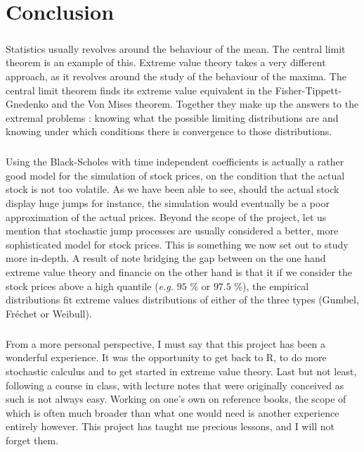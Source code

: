 \chapter{Conclusion}
\paragraph{}
Statistics usually revolves around the behaviour of the mean. The central limit theorem is an example of this. Extreme value theory takes a very different approach, as it revolves around the study of the behaviour of the maxima. The central limit theorem finds its extreme value equivalent in the Fisher-Tippett-Gnedenko and the Von Mises theorem. Together they make up the answers to the extremal problems : knowing what the possible limiting distributions are and knowing under which conditions there is convergence to those distributions.
\paragraph{}
Using the Black-Scholes with time independent coefficients is actually a rather good model for the simulation of stock prices, on the condition that the actual stock is not too volatile. As we have been able to see, should the actual stock display huge jumps for instance, the simulation would eventually be a poor approximation of the actual prices. Beyond the scope of the project, let us mention that stochastic jump processes are usually considered a better, more sophisticated model for stock prices. This is something we now set out to study more in-depth.\newline
A result of note bridging the gap between on the one hand extreme value theory and financie on the other hand is that it if we consider the stock prices above a high quantile (\textit{e.g.} $95$ \% or $97.5$ \%), the empirical distributions fit extreme values distributions of either of the three types (Gumbel, Fréchet or Weibull).

\bigskip
\paragraph{}
From a more personal perspective, I must say that this project has been a wonderful experience. It was the opportunity to get back to R, to do more stochastic calculus and to get started in extreme value theory. Last but not least, following a course in class, with lecture notes that were originally conceived as such is not always easy. Working on one's own on reference books, the scope of which is often much broader than what one would need is another experience entirely however. This project has taught me precious lessons, and I will not forget them.